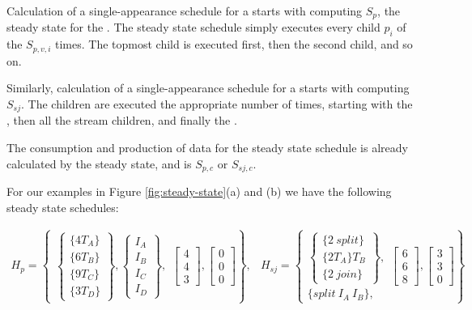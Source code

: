 \begin{comment}
The steady state state schedule is calculated as a
single-appearance schedule.
\end{comment}
Calculation of a single-appearance schedule for a \pipeline starts
with computing $S_p$, the steady state for the {\pipeline}. The
steady state schedule simply executes every child $p_i$ of the
\pipeline $S_{p,v,i}$ times. The topmost child is executed first,
then the second child, and so on.

Similarly, calculation of a single-appearance schedule for a
\splitjoin starts with computing $S_{sj}$. The children are
executed the appropriate number of times, starting with the
\splitter, then all the stream children, and finally the \joiner.

The consumption and production of data for the steady state
schedule is already calculated by the steady state, and is
$S_{p,c}$ or $S_{sj,c}$.

For our examples in Figure \ref{fig:steady-state}(a) and (b) we
have the following steady state schedules:

\begin{displaymath}
\begin{array}{lr}
H_p = \left\{\begin{array}{l}\left\{\begin{array}{c}\{4T_A\}\\
\{6T_B\} \\ \{9T_C\}\\ \{3T_D\}\end{array}\right\}, \left\{\begin{array}{c}I_A\\
I_B\\ I_C\\ I_D\end{array}\right\},\end{array} \left[
\begin{array}{c}
4\\4\\3
\end{array}\right], \left[
\begin{array}{c}
0\\0\\0
\end{array}\right] \right\}, &
H_{sj} = \left\{\begin{array}{c}\left\{\begin{array}{c}\{2\
split\}\\ \{2T_A\} T_B \\ \{2\ join\}\end{array}\right\},\\
\{split\ I_A\ I_B\}, \end{array}\left[
\begin{array}{c}
6\\6\\8
\end{array}\right], \left[
\begin{array}{c}
3\\3\\0
\end{array}\right] \right\}
\end{array}
\end{displaymath}

